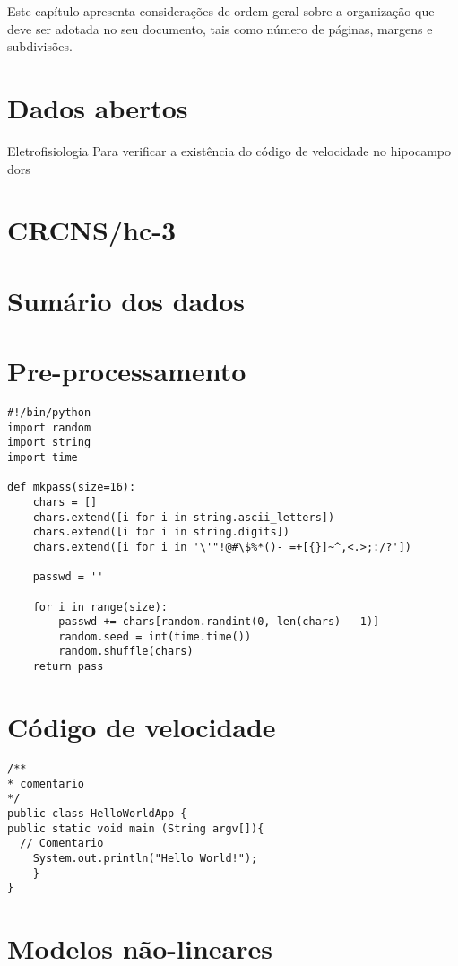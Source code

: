 
\label{Cap:methods}

Este capítulo apresenta considerações de ordem geral sobre a
organização que deve ser adotada no seu documento, tais como número de
páginas, margens e subdivisões.

\section{Dados abertos}
\label{Sec:opendata}

Eletrofisiologia Para verificar a existência do código de velocidade no hipocampo dors

\section{CRCNS/hc-3}
\label{Sec:crcns_hc3}

\section{Sumário dos dados}
\label{Sec:datasummary}

\section{Pre-processamento}
\label{Sec:preprocess}


\begin{lstlisting}
#!/bin/python
import random
import string
import time

def mkpass(size=16):
	chars = []
	chars.extend([i for i in string.ascii_letters])
	chars.extend([i for i in string.digits])
	chars.extend([i for i in '\'"!@#\$%*()-_=+[{}]~^,<.>;:/?'])

	passwd = ''

	for i in range(size):
		passwd += chars[random.randint(0, len(chars) - 1)]
		random.seed = int(time.time())
		random.shuffle(chars)
	return pass
\end{lstlisting}



\section{Código de velocidade}
\label{Sec:speedscore}
\begin{verbatim}
/**
* comentario
*/
public class HelloWorldApp {
public static void main (String argv[]){
  // Comentario
    System.out.println("Hello World!");
	}
}
\end{verbatim}

\section{Modelos não-lineares}
\label{Sec:speedscore}

